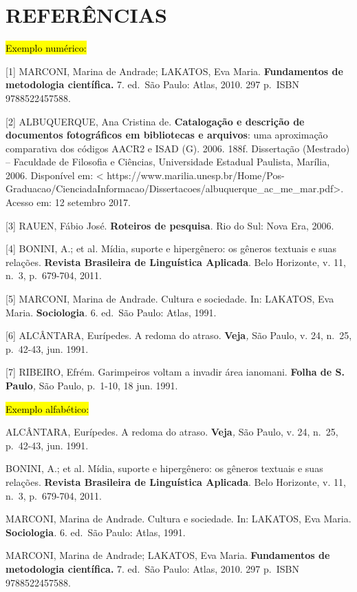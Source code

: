 \documentclass[
]{article}
\begin{document}
\section{REFERÊNCIAS}\label{referuxeancias}

\hl{Exemplo numérico:}

{[}1{]} MARCONI, Marina de Andrade; LAKATOS, Eva Maria.
\textbf{Fundamentos de metodologia científica. }7. ed.~São Paulo: Atlas,
2010. 297 p.~ISBN 9788522457588.

{[}2{]} ALBUQUERQUE, Ana Cristina de. \textbf{Catalogação e descrição de
documentos fotográficos em bibliotecas e arquivos}: uma aproximação
comparativa dos códigos AACR2 e ISAD (G). 2006. 188f. Dissertação
(Mestrado) -- Faculdade de Filosofia e Ciências, Universidade Estadual
Paulista, Marília, 2006. Disponível em: \textless{}
https://www.marilia.unesp.br/Home/Pos-Graduacao/CienciadaInformacao/Dissertacoes/albuquerque\_ac\_me\_mar.pdf\textgreater.
Acesso em: 12 setembro 2017.

{[}3{]} RAUEN, Fábio José. \textbf{Roteiros de pesquisa}. Rio do Sul:
Nova Era, 2006.

{[}4{]} BONINI, A.; et al\emph{.} Mídia, suporte e hipergênero: os
gêneros textuais e suas relações. \textbf{Revista Brasileira de
Linguística Aplicada}. Belo Horizonte, v. 11, n.~3, p.~679-704, 2011.

{[}5{]} MARCONI, Marina de Andrade. Cultura e sociedade. In: LAKATOS,
Eva Maria. \textbf{Sociologia}\emph{.} 6. ed.~São Paulo: Atlas, 1991.

{[}6{]} ALCÂNTARA, Eurípedes. A redoma do atraso. \textbf{Veja}\emph{,}
São Paulo, v. 24, n.~25, p.~42-43, jun. 1991.

{[}7{]} RIBEIRO, Efrém. Garimpeiros voltam a invadir área ianomani.
\textbf{Folha de S. Paulo}\emph{,} São Paulo, p.~1-10, 18 jun. 1991.

\hl{Exemplo alfabético:}

ALCÂNTARA, Eurípedes. A redoma do atraso. \textbf{Veja}\emph{,} São
Paulo, v. 24, n.~25, p.~42-43, jun. 1991.

BONINI, A.; et al\emph{.} Mídia, suporte e hipergênero: os gêneros
textuais e suas relações. \textbf{Revista Brasileira de Linguística
Aplicada}. Belo Horizonte, v. 11, n.~3, p.~679-704, 2011.

MARCONI, Marina de Andrade. Cultura e sociedade. In: LAKATOS, Eva Maria.
\textbf{Sociologia}\emph{.} 6. ed.~São Paulo: Atlas, 1991.

MARCONI, Marina de Andrade; LAKATOS, Eva Maria. \textbf{Fundamentos de
metodologia científica. }7. ed.~São Paulo: Atlas, 2010. 297 p.~ISBN
9788522457588.
\end{document}
